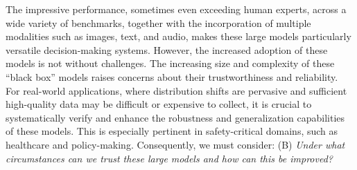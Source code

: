 \documentclass{article}
\newcommand{\todo}[1]{\textcolor{red}{~TODO: #1}}
\begin{document}
The impressive performance, sometimes even exceeding human experts, across a wide variety of benchmarks, together with the incorporation of multiple modalities such as images, text, and audio, makes these large models particularly versatile decision-making systems.
However, the increased adoption of these models is not without challenges. The increasing size and complexity of these ``black box'' models raises concerns about their trustworthiness and reliability.
For real-world applications, where distribution shifts are pervasive and sufficient high-quality data may be difficult or expensive to collect, it is crucial to systematically verify and enhance the robustness and generalization capabilities of these models.   
This is especially pertinent in safety-critical domains, such as healthcare and policy-making. %
Consequently, we must consider: (B) \textit{Under what circumstances can we trust these large models and how can this be improved?} %
\end{document}
